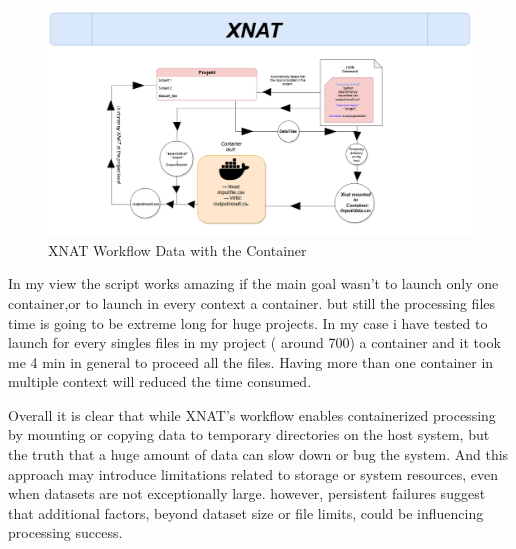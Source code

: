 \begin{figure}
    \centering
    \includegraphics[width=1\linewidth]{en/content/WO.png}
    \caption{XNAT Workflow Data with the Container  }
    \label{fig:enter-label}
\end{figure}
In my view the script works amazing if the main goal wasn't to launch only one container,or to launch in every context a container. but still the processing files time is going to be extreme long for huge projects. In my case i have tested to launch for every singles files in my project ( around 700) a container and it took me 4 min in general to proceed all the files. Having more than one container in multiple context will reduced the time consumed.

Overall it is clear that while XNAT’s workflow enables containerized processing by mounting or copying data to temporary directories on the host system, but the truth that a huge amount of data can slow down or bug the system. And this approach may introduce limitations related to storage or system resources, even when datasets are not exceptionally large. however, persistent failures suggest that additional factors, beyond dataset size or file limits, could be influencing processing success.